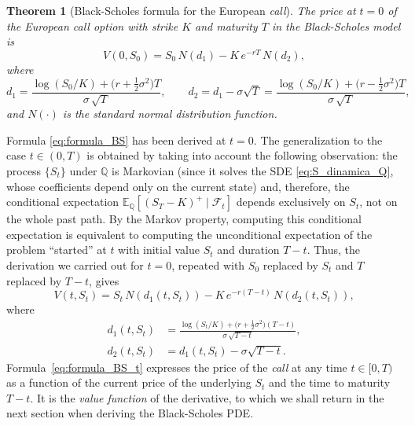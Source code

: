 \documentclass[11pt,a4paper,oneside]{report}
\theoremstyle{plain}
\newtheorem{teorema}{Theorem}[chapter]
\theoremstyle{definition}
\theoremstyle{remark}
\newcommand{\E}{\mathbb{E}}
\newcommand{\Q}{\mathbb{Q}}
\newcommand{\F}{\mathcal{F}}
\newcommand{\1}{\mathbf{1}}
\begin{document}
\begin{teorema}[Black-Scholes formula for the European \emph{call}]
\label{teo:formula_BS}
The price at $t = 0$ of the European \emph{call} option with
\emph{strike} $K$ and maturity $T$ in the Black-Scholes model is
\begin{equation}\label{eq:formula_BS}
  \boxed{\;
    V(0, S_0) = S_0\, N(d_1) - K\, e^{-rT}\, N(d_2),
  \;}
\end{equation}
where
\begin{equation*}
  d_1 = \frac{\log(S_0/K) + \bigl(r + \tfrac{1}{2}\sigma^2\bigr) T}
              {\sigma\, \sqrt{T}},
  \qquad
  d_2 = d_1 - \sigma\sqrt{T}
      = \frac{\log(S_0/K) + \bigl(r - \tfrac{1}{2}\sigma^2\bigr) T}
              {\sigma\, \sqrt{T}},
\end{equation*}
and $N(\cdot)$ is the standard normal distribution function.
\end{teorema}

Formula
\eqref{eq:formula_BS} has been derived at $t = 0$. The
generalization to the case $t \in (0, T)$ is obtained by taking into
account the following observation: the process $\{S_t\}$ under $\Q$
is Markovian (since it solves the SDE \eqref{eq:S_dinamica_Q}, whose
coefficients depend only on the current state) and, therefore, the
conditional expectation $\E_\Q[(S_T - K)^+ \mid \F_t]$ depends
exclusively on $S_t$, not on the whole past path. By the Markov
property, computing this conditional expectation is equivalent to
computing the unconditional expectation of the problem ``started''
at $t$ with initial value $S_t$ and duration $T - t$. Thus, the
derivation we carried out for $t = 0$, repeated with $S_0$ replaced
by $S_t$ and $T$ replaced by $T - t$, gives
\begin{equation}\label{eq:formula_BS_t}
  \boxed{\;
    V(t, S_t) = S_t\, N(d_1(t, S_t)) - K\, e^{-r(T-t)}\, N(d_2(t, S_t)),
  \;}
\end{equation}
where
\begin{align*}
  d_1(t, S_t) &= \frac{\log(S_t/K) + \bigl(r + \tfrac{1}{2}\sigma^2\bigr)(T-t)}
                       {\sigma\, \sqrt{T-t}}, \\
  d_2(t, S_t) &= d_1(t, S_t) - \sigma\sqrt{T-t}.
\end{align*}
Formula~\eqref{eq:formula_BS_t} expresses the price of the
\emph{call} at any time $t \in [0, T)$ as a function of the current
price of the underlying $S_t$ and the time to maturity $T - t$. It is
the \emph{value function} of the derivative, to which we shall return
in the next section when deriving the Black-Scholes PDE.
\end{document}
